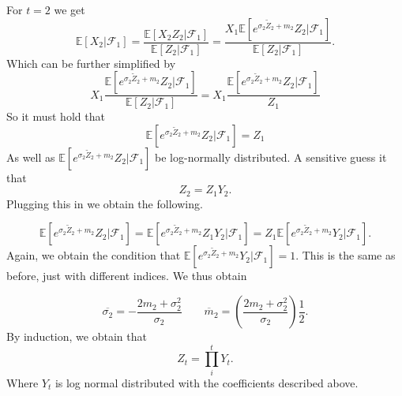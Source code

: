 \documentclass{article}
\begin{document}
For \(t=2\) we get
\begin{equation}
  \mathbb{E} \left[ X_2 | \mathcal{F}_1 \right] = \frac{\mathbb{E} \left[ X_2 Z_2 |\mathcal{F}_1 \right]}{\mathbb{E} \left[ Z_2|\mathcal{F}_1 \right]} = \frac{X_1 \mathbb{E} \left[ e^{\sigma _2 \widetilde{Z}_2 +m_2} Z_2 |\mathcal{F}_1 \right]}{\mathbb{E} \left[ Z_2|\mathcal{F}_1 \right]}.
\end{equation}
Which can be further simplified by
\begin{equation}
  X_1 \frac{\mathbb{E} \left[ e^{\sigma _2 \widetilde{Z}_2 +m_2} Z_2 |\mathcal{F}_1 \right]}{\mathbb{E} \left[ Z_2|\mathcal{F}_1 \right]} = X_{1}  \frac{\mathbb{E} \left[ e^{\sigma _2 \widetilde{Z}_2 +m_2} Z_2 |\mathcal{F}_1 \right]}{Z_1}
\end{equation}
So it must hold that
\begin{equation}
  \mathbb{E} \left[ e^{\sigma _2 \widetilde{Z}_2 +m_2} Z_2 |\mathcal{F}_1 \right] = Z_1
\end{equation}
As well as \(\mathbb{E} \left[ e^{\sigma _2 \widetilde{Z}_2 +m_2} Z_2 |\mathcal{F}_1 \right]\) be log-normally distributed.
A sensitive guess it that
\begin{equation}
  Z_2 = Z_1 Y_2.
\end{equation}
Plugging this in we obtain the following.

\begin{equation}
  \mathbb{E} \left[ e^{\sigma _2 \widetilde{Z}_2 +m_2} Z_2 |\mathcal{F}_1 \right] = \mathbb{E} \left[ e^{\sigma _2 \widetilde{Z}_2 +m_2} Z_1 Y_2 |\mathcal{F}_1 \right] = Z_1\mathbb{E} \left[ e^{\sigma _2 \widetilde{Z}_2 +m_2} Y_2 |\mathcal{F}_1 \right].
\end{equation}
Again, we obtain the condition that \(\mathbb{E} \left[ e^{\sigma _2 \widetilde{Z}_2 +m_2} Y_2 |\mathcal{F}_1 \right] = 1\).
This is the same as before, just with different indices.
We thus obtain

\begin{equation}
  \overline{\sigma _2} = -\frac{2m_2 +\sigma _2^2}{\sigma _2} \quad\quad \overline{m} _2 =\left(  \frac{2m_{2}+\sigma _2^2 }{ \sigma _2}  \right) \frac{1}{2}.
\end{equation}
By induction, we obtain that
\begin{equation}
  Z_t = \prod_{i}^t Y_t.
\end{equation}
Where \(Y_t\) is log normal distributed with the coefficients described above.
\end{document}
